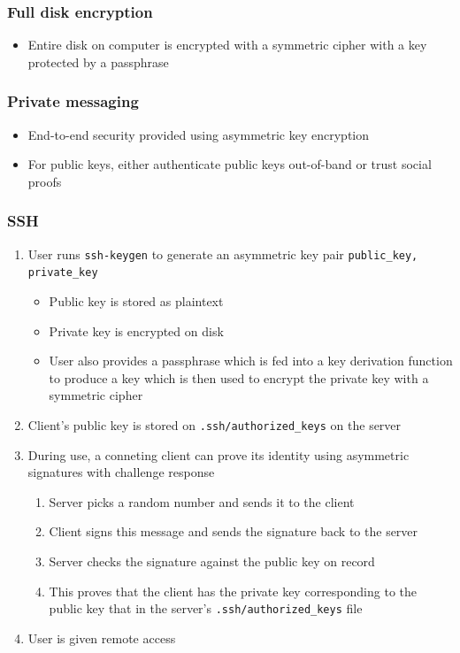 \documentclass[letterpaper,12pt]{article}
\begin{document}
\subsubsection{Full disk encryption}
\begin{itemize}
 \item Entire disk on computer is encrypted with a symmetric cipher with a key protected by a passphrase
\end{itemize}

\subsubsection{Private messaging}
\begin{itemize}
 \item End-to-end security provided using asymmetric key encryption
 \item For public keys, either authenticate public keys out-of-band or trust social proofs
\end{itemize}

\subsubsection{SSH}
\begin{enumerate}
 \item User runs \lstinline{ssh-keygen} to generate an asymmetric key pair \lstinline{public_key, private_key}
       \begin{itemize}
        \item Public key is stored as plaintext
        \item Private key is encrypted on disk
        \item User also provides a passphrase which is fed into a key derivation function to produce a key which is then used to encrypt the private key with a symmetric cipher
       \end{itemize}
 \item Client's public key is stored on \lstinline{.ssh/authorized_keys} on the server
 \item During use, a conneting client can prove its identity using asymmetric signatures with challenge response
       \begin{enumerate}
        \item Server picks a random number and sends it to the client
        \item Client signs this message and sends the signature back to the server
        \item Server checks the signature against the public key on record
        \item This proves that the client has the private key corresponding to the public key that in the server's \lstinline{.ssh/authorized_keys} file
       \end{enumerate}
 \item User is given remote access
\end{enumerate}
\end{document}
